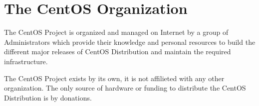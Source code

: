 
\section{The CentOS Organization}

The CentOS Project is organized and managed on Internet by a group of
Administrators which provide their knowledge and personal resources to
build the different major releases of CentOS Distribution and maintain
the required infrastructure. 

The CentOS Project exists by its own, it is not affilieted with any
other organization. The only source of hardware or funding to
distribute the CentOS Distribution is by donations.

